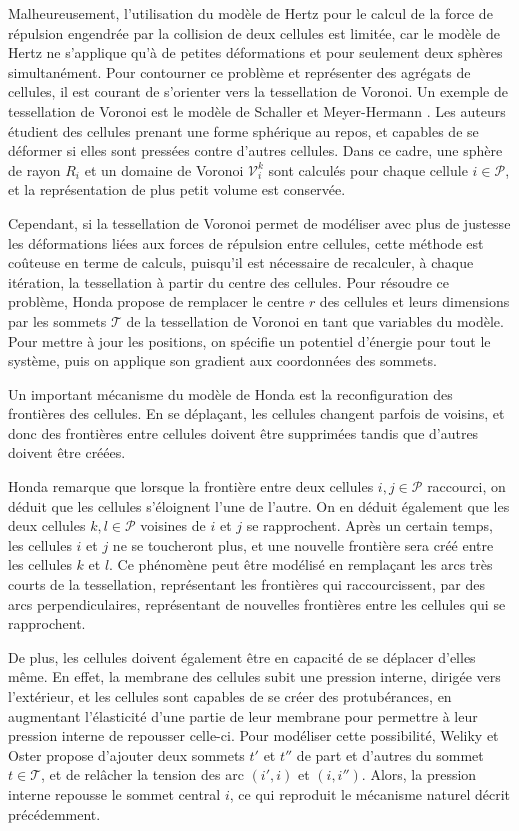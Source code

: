 \documentclass[11pt,a4paper]{article}
\begin{document}
Malheureusement, l'utilisation du modèle de Hertz pour le calcul de la force de répulsion engendrée par la collision de deux cellules est limitée, car le modèle de Hertz ne s'applique qu'à de petites déformations et pour seulement deux sphères simultanément. Pour contourner ce problème et représenter des agrégats de cellules, il est courant de s'orienter vers la tessellation de Voronoi. Un exemple de tessellation de Voronoi est le modèle de Schaller et Meyer-Hermann \cite{schaller2005multicellular}. Les auteurs étudient des cellules prenant une forme sphérique au repos, et capables de se déformer si elles sont pressées contre d'autres cellules. Dans ce cadre, une sphère de rayon $R_i$ et un domaine de Voronoi $\mathcal{V}_i^k$ sont calculés pour chaque cellule $i \in \mathcal{P}$, et la représentation de plus petit volume est conservée. 

Cependant, si la tessellation de Voronoi permet de modéliser avec plus de justesse les déformations liées aux forces de répulsion entre cellules, cette méthode est coûteuse en terme de calculs, puisqu'il est nécessaire de recalculer, à chaque itération, la tessellation à partir du centre des cellules. Pour résoudre ce problème, Honda \cite{honda1978description} propose de remplacer le centre $r$ des cellules et leurs dimensions par les sommets $\mathcal{T}$ de la tessellation de Voronoi en tant que variables du modèle. Pour mettre à jour les positions, on spécifie un potentiel d'énergie pour tout le système, puis on applique son gradient aux coordonnées des sommets. 

Un important mécanisme du modèle de Honda est la reconfiguration des frontières des cellules. En se déplaçant, les cellules changent parfois de voisins, et donc des frontières entre cellules doivent être supprimées tandis que d'autres doivent être créées. 

Honda remarque que lorsque la frontière entre deux cellules $i,j \in \mathcal{P}$ raccourci, on déduit que les cellules s'éloignent l'une de l'autre. On en déduit également que les deux cellules $k,l \in \mathcal{P}$ voisines de $i$ et $j$ se rapprochent. Après un certain temps, les cellules $i$ et $j$ ne se toucheront plus, et une nouvelle frontière sera créé entre les cellules $k$ et $l$. Ce phénomène peut être modélisé en remplaçant les arcs très courts de la tessellation, représentant les frontières qui raccourcissent, par des arcs perpendiculaires, représentant de nouvelles frontières entre les cellules qui se rapprochent.

De plus, les cellules doivent également être en capacité de se déplacer d'elles même. En effet, la membrane des cellules subit une pression interne, dirigée vers l'extérieur, et les cellules sont capables de se créer des protubérances, en augmentant l'élasticité d'une partie de leur membrane pour permettre à leur pression interne de repousser celle-ci. Pour modéliser cette possibilité, Weliky et Oster \cite{weliky1990mechanical} propose d'ajouter deux sommets $t'$ et $t''$ de part et d'autres du sommet $t \in \mathcal{T}$, et de relâcher la tension des arc $(i',i)$ et $(i,i'')$. Alors, la pression interne repousse le sommet central $i$, ce qui reproduit le mécanisme naturel décrit précédemment.  
\end{document}
